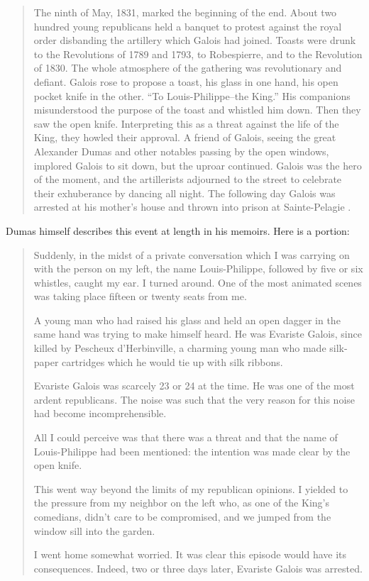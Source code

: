 \documentclass[12pt]{article}
\begin{document}
\begin{quote}
The ninth of May, 1831, marked the beginning of the end. About two hundred young republicans held a banquet to protest against the royal order disbanding the artillery which Galois had joined. Toasts were drunk to the Revolutions of 1789 and 1793, to Robespierre, and to the Revolution of 1830. The whole atmosphere of the gathering was revolutionary and defiant. Galois rose to propose a toast, his glass in one hand, his open pocket knife in the other. ``To Louis-Philippe--the King.'' His companions misunderstood the purpose of the toast and whistled him down. Then they saw the open knife. Interpreting this as a threat against the life of the King, they howled their approval. A friend of Galois, seeing the great Alexander Dumas and other notables passing by the open windows, implored Galois to sit down, but the uproar continued. Galois was the hero of the moment, and the artillerists adjourned to the street to celebrate their exhuberance by dancing all night. The following day Galois was arrested at his mother's house and thrown into prison at Sainte-Pelagie \cite{49}.
\end{quote}
Dumas himself describes this event at length in his memoirs. Here is a portion:

\begin{quotation}
Suddenly, in the midst of a private conversation which I was carrying on with the person on my left, the name Louis-Philippe, followed by five or six whistles, caught my ear. I turned around. One of the most animated scenes was taking place fifteen or twenty seats from me.

A young man who had raised his glass and held an open dagger in the same hand was trying to make himself heard. He was Evariste Galois, since killed by Pescheux d'Herbinville, a charming young man who made silk-paper cartridges which he would tie up with silk ribbons.

Evariste Galois was scarcely 23 or 24 at the time. He was one of the most ardent republicans. The noise was such that the very reason for this noise had become incomprehensible. 

All I could perceive was that there was a threat and that the name of Louis-Philippe had been mentioned: the intention was made clear by the open knife. 

This went way beyond the limits of my republican opinions. I yielded to the pressure from my neighbor on the left who, as one of the King's comedians, didn't care to be compromised, and we jumped from the window sill into the garden. 

I went home somewhat worried. It was clear this episode would have its consequences. Indeed, two or three days later, Evariste Galois was arrested. \cite{50}
\end{quotation}
\end{document}
